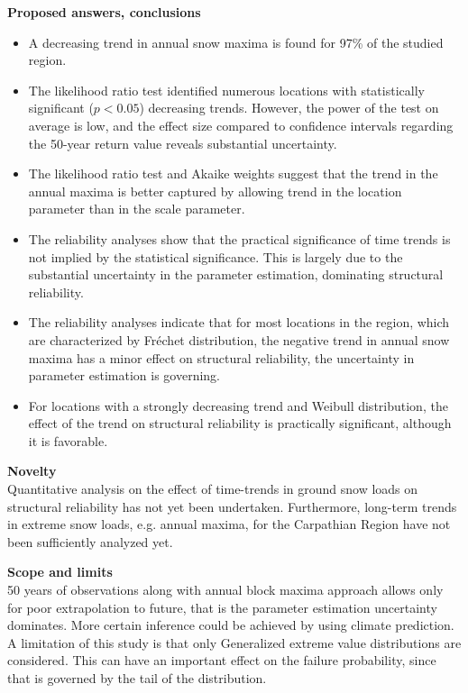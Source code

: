 \begin{enumerate}[leftmargin=*, align=left]
    \textbf{Proposed answers, conclusions}
    \begin{itemize}
      \item A decreasing trend in annual snow maxima is found for 97\% of the studied region.
      \item The likelihood ratio test identified numerous locations with statistically significant ($p < 0.05$) decreasing trends. However, the power of the test on average is low, and the effect size compared to confidence intervals regarding the 50-year return value reveals substantial uncertainty.
      \item The likelihood ratio test and Akaike weights suggest that the trend in the annual maxima is better captured by allowing trend in the location parameter than in the scale parameter.
      \item The reliability analyses show that the practical significance of time trends is not implied by the statistical significance. This is largely due to the substantial uncertainty in the parameter estimation, dominating structural reliability.
      \item The reliability analyses indicate that for most locations in the region, which are characterized by Fréchet distribution, the negative trend in annual snow maxima has a minor effect on structural reliability, the uncertainty in parameter estimation is governing.
      \item For locations with a strongly decreasing trend and Weibull distribution, the effect of the trend on structural reliability is practically significant, although it is favorable.
    \end{itemize}

    \textbf{Novelty} \\
    Quantitative analysis on the effect of time-trends in ground snow loads on structural reliability has not yet been undertaken. Furthermore, long-term trends in extreme snow loads, e.g. annual maxima, for the Carpathian Region have not been sufficiently analyzed yet.
  
    \textbf{Scope and limits} \\
    50 years of observations along with annual block maxima approach allows only for poor extrapolation to future, that is the parameter estimation uncertainty dominates. More certain inference could be achieved by using climate prediction. A limitation of this study is that only Generalized extreme value distributions are considered. This can have an important effect on the failure probability, since that is governed by the tail of the distribution.


\end{enumerate}

